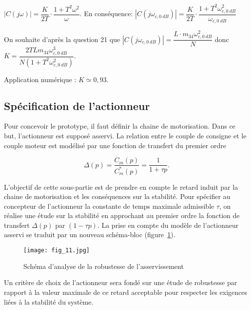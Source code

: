 \ifprof
\begin{corrige}
$\left| C\left(j\omega\right)\right|= \dfrac{K}{2T}\cdot \dfrac{1+T^2\omega^2}{\omega}$. En conséquence:
$\left| C\left(j\omega_{c,\SI{0}{dB}}\right)\right| = \dfrac{K}{2T}\cdot \dfrac{1+T^2\omega_{c,\SI{0}{dB}}^2}{\omega_{c,\SI{0}{dB}}}$


On souhaite d'après la question 21 que $\left| C\left(j\omega_{c,\SI{0}{dB}}\right)\right| = \dfrac{L\cdot m_{34}\omega_{c,\SI{0}{dB}}^2}{N}$ donc  $\boxed{K=\dfrac{2TLm_{34}\omega_{c,\SI{0}{dB}}^3}{N(1+T^2\omega_{c,\SI{0}{dB}}^2)}}$.

Application numérique : $\boxed{K \simeq 0,93}$.

\end{corrige}
\else
\fi

\subsection{Spécification de l'actionneur}
\ifprof
\else
Pour concevoir le prototype, il faut définir la chaine de motorisation. Dans ce but, l'actionneur est supposé asservi. La relation entre le couple de consigne et le couple moteur est modélisé par une fonction de transfert du premier ordre

$$
\Delta(p)=\frac{C_{m}(p)}{C_{m}^{*}(p)}=\frac{1}{1+\tau p} .
$$

L'objectif de cette sous-partie est de prendre en compte le retard induit par la chaine de motorisation et les conséquences sur la stabilité. Pour spécifier au concepteur de l'actionneur la constante de temps maximale admissible $\tau$, on réalise une étude sur la stabilité en approchant au premier ordre la fonction de transfert $\Delta(p)$ par $(1-\tau p)$. La prise en compte du modèle de l'actionneur asservi se traduit par un nouveau schéma-bloc (figure~\ref{fig:11}).


\begin{figure}[H]
\centering
\texttt{[image: fig\_11.jpg]}
\caption{\label{fig:11} Schéma d'analyse de la robustesse de l'asservissement}
\end{figure}


Un critère de choix de l'actionneur sera fondé sur une étude de robustesse par rapport à la valeur maximale de ce retard acceptable pour respecter les exigences liées à la stabilité du système.

